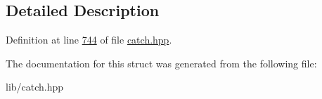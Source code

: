 \subsection{Detailed Description}


Definition at line \mbox{\hyperlink{catch_8hpp_source_l00744}{744}} of file \mbox{\hyperlink{catch_8hpp_source}{catch.\+hpp}}.



The documentation for this struct was generated from the following file\+:\begin{DoxyCompactItemize}
\item 
lib/catch.\+hpp\end{DoxyCompactItemize}
